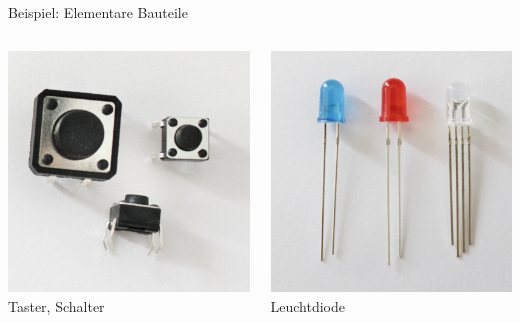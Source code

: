 {\begin{frame}{Beispiel: Elementare Bauteile}
\begin{columns}
        \includegraphics[width=.8\textwidth]{2-hardwaredesign/img/komponenten_elementar_taster} \\
        Taster, Schalter

        \includegraphics[width=.8\textwidth]{2-hardwaredesign/img/komponenten_elementar_led} \\
        Leuchtdiode
    \end{columns}
\end{frame}
}

